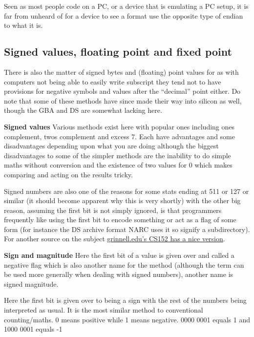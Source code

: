 \documentclass[
]{book}
\begin{document}
Seen as most people code on a PC, or a device that is emulating a PC setup, it is far from unheard of for a device to see a format use the opposite type of endian to what it is.

\hypertarget{signed-values-floating-point-and-fixed-point}{%
\subsection{Signed values, floating point and fixed point}\label{signed-values-floating-point-and-fixed-point}}

There is also the matter of signed bytes and (floating) point values for as with computers not being able to easily write subscript they tend not to have provisions for negative symbols and values after the ``decimal'' point either. Do note that some of these methods have since made their way into silicon as well, though the GBA and DS are somewhat lacking here.

\textbf{Signed values} Various methods exist here with popular ones including ones complement, twos complement and excess 7. Each have advantages and some disadvantages depending upon what you are doing although the biggest disadvantages to some of the simpler methods are the inability to do simple maths without conversion and the existence of two values for 0 which makes comparing and acting on the results tricky.

Signed numbers are also one of the reasons for some stats ending at 511 or 127 or similar (it should become apparent why this is very shortly) with the other big reason, assuming the first bit is not simply ignored, is that programmers frequently like using the first bit to encode something or act as a flag of some form (for instance the DS archive format NARC uses it so signify a subdirectory). For another source on the subject \href{http://www.cs.grinnell.edu/~rebelsky/Courses/CS152/97F/Readings/student-binary.html}{grinnell.edu's CS152 has a nice version}.

\textbf{Sign and magnitude} Here the first bit of a value is given over and called a negative flag which is also another name for the method (although the term can be used more generally when dealing with signed numbers), another name is signed magnitude.

Here the first bit is given over to being a sign with the rest of the numbers being interpreted as usual. It is the most similar method to conventional counting/maths. 0 means positive while 1 means negative. 0000 0001 equals 1 and 1000 0001 equals -1
\end{document}
